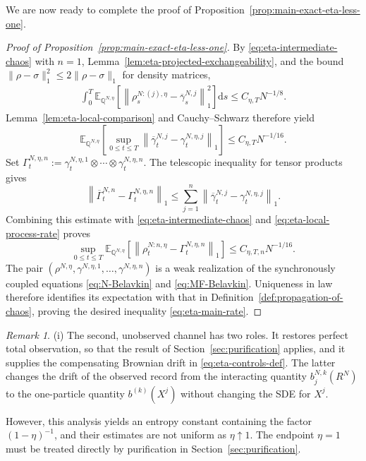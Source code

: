 \documentclass[10pt,a4paper,reqno]{amsart}
\numberwithin{equation}{section}
\theoremstyle{plain}
\theoremstyle{definition}
\theoremstyle{remark}
\newtheorem{remark}[theorem]{Remark}
\renewcommand{\d}{\mathrm d}
\newcommand{\E}{\mathbb E}
\newcommand{\Q}{\mathbb Q}
\newcommand{\1}{\mathbf 1}
\begin{document}
We are now ready to complete the proof of Proposition~\ref{prop:main-exact-eta-less-one}.

\begin{proof}[Proof of Proposition~\ref{prop:main-exact-eta-less-one}]
By \eqref{eq:eta-intermediate-chaos} with \(n=1\), Lemma~\ref{lem:eta-projected-exchangeability}, and the
bound \(\|\rho-\sigma\|_1^2\le2\|\rho-\sigma\|_1\) for density matrices,
\[
\begin{aligned}
  \int_0^T
  \E_{\Q^{N,\eta}}
  \left[
    \left\|
      \rho_s^{N:(j),\eta}
      -
      \overline\gamma_s^{N,j}
    \right\|_1^2
  \right]\d s\le
  C_{\eta,T}N^{-1/8}.
\end{aligned}
\]
Lemma~\ref{lem:eta-local-comparison} and Cauchy--Schwarz therefore yield
\begin{equation}
  \E_{\Q^{N,\eta}}
  \left[
    \sup_{0\le t\le T}
    \left\|
      \overline\gamma_t^{N,j}
      -
      \gamma_t^{N,\eta,j}
    \right\|_1
  \right]
  \le
  C_{\eta,T}N^{-1/16}.
  \label{eq:eta-local-process-rate}
\end{equation}
Set
\(
  \Gamma_t^{N,\eta,n}
  :=
  \gamma_t^{N,\eta,1}
  \otimes\cdots\otimes
  \gamma_t^{N,\eta,n}.
\)
The telescopic inequality for tensor products gives
\[
  \left\|
    \overline\Gamma_t^{N,n}
    -
    \Gamma_t^{N,\eta,n}
  \right\|_1
  \le
  \sum_{j=1}^n
  \left\|
    \overline\gamma_t^{N,j}
    -
    \gamma_t^{N,\eta,j}
  \right\|_1.
\]
Combining this estimate with \eqref{eq:eta-intermediate-chaos} and
\eqref{eq:eta-local-process-rate} proves
\[
  \sup_{0\le t\le T}
  \E_{\Q^{N,\eta}}
  \left[
    \left\|
      \rho_t^{N:n,\eta}
      -
      \Gamma_t^{N,\eta,n}
    \right\|_1
  \right]
  \le
  C_{\eta,T,n}N^{-1/16}.
\]
The pair \((\rho^{N,\eta},\gamma^{N,\eta,1},\ldots,\gamma^{N,\eta,n})\)
is a weak realization of the synchronously coupled equations
\eqref{eq:N-Belavkin} and \eqref{eq:MF-Belavkin}.  Uniqueness in law
therefore identifies its expectation with that in
Definition~\ref{def:propagation-of-chaos}, proving
the desired inequality \eqref{eq:eta-main-rate}.
\end{proof}

\begin{remark}
{\rm (i)} The second, unobserved channel has two roles.  It restores perfect total
observation, so that the result of Section~\ref{sec:purification} applies,
and it supplies the compensating Brownian drift in
\eqref{eq:eta-controls-def}.  The latter changes the drift of the observed
record from the interacting quantity \(b_j^{N,k}(R^N)\) to the one-particle
quantity \(b^{(k)}(X^j)\) without changing the SDE for \(X^j\).

 However,  this analysis yields an entropy constant containing the factor \((1-\eta)^{-1}\),  and their estimates
are not uniform as \(\eta\uparrow1\).  The endpoint \(\eta=1\)
must be treated directly by purification in Section~\ref{sec:purification}.
\end{remark}
\end{document}
